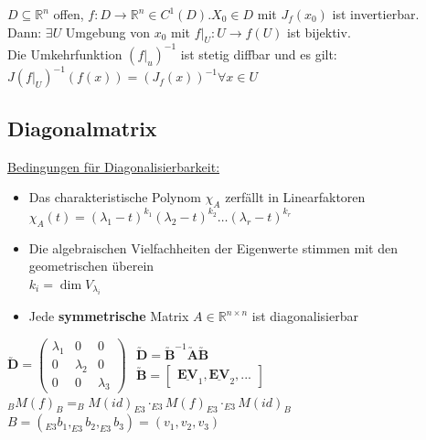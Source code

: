 \documentclass[6pt,a4paper]{scrartcl}
\newcommand{\mat}[1]{\ensuremath{\begin{bmatrix} #1 \end{bmatrix}}}								%
\newcommand{\ma}[1]{\ensuremath{\utilde{\boldsymbol {#1}}}}										%
\renewcommand{\vec}[1]{\ensuremath{\underline{\boldsymbol {#1}}}}								%
\newcommand{\ra}[0]{\ensuremath{\rightarrow}} 									%
\newcommand{\R}{\ensuremath{\mathbb R}}
\begin{document}
\begin{multicols}{4}
$D \subseteq \mathbb R^n$ offen, $f: D \ra \mathbb R^n \in C^1 (D). X_0 \in D$ mit $J_f (x_0)$ ist invertierbar. \\
Dann: $\exists U$ Umgebung von $x_0$ mit $f |_U : U \ra f(U)$ ist bijektiv. \\
Die Umkehrfunktion $(f|_u)^{-1}$ ist stetig diffbar und es gilt: \\
$J(f|_U)^{-1} (f(x)) = (J_f (x))^{-1} \forall x \in U$


\subsection{Diagonalmatrix}

\underline{Bedingungen für Diagonalisierbarkeit:}
\begin{itemize} \itemsep0pt
	\item Das charakteristische Polynom $\chi_{A}$ zerfällt in Linearfaktoren\\
				$\chi_{A}(t) = (\lambda_1 - t)^{k_1}(\lambda_2 - t)^{k_2}\ldots(\lambda_r - t)^{k_r}$
	\item Die algebraischen Vielfachheiten der Eigenwerte stimmen mit den geometrischen überein\\
				$k_i = \dim V_{\lambda_i}$
	\item Jede \textbf{symmetrische} Matrix $A \in \R^{n \times n}$ ist diagonalisierbar
\end{itemize}

$\ma D = \begin{pmatrix} \lambda_1 & 0 & 0 \\ 0 & \lambda_2 & 0 \\ 0 & 0 & \lambda_3 \end{pmatrix}$ \qquad $\begin{array}{l} \ma D = \ma B^{-1} \ma A \ma B \\[0.5em] \ma B = \mat{\vec{EV}_1, \vec{EV}_2, ...} \end{array}$\\
$_B M(f)_B = _B M (id)_{E3} \cdot _{E3} M(f)_{E3} \cdot _{E3} M(id)_B$ \\
$B = ( _{E3} b_1 , _{E3} b_2 ,_{E3} b_3 ) = (v_1, v_2, v_3)$



\end{multicols}
\end{document}
